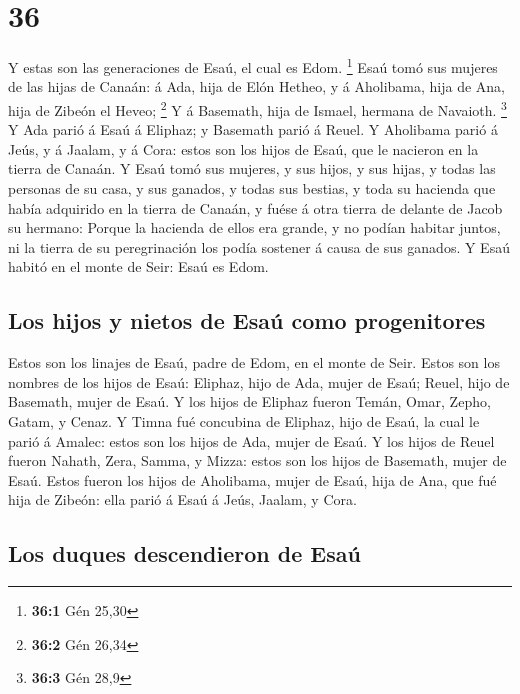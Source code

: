\hypertarget{section-35}{%
\section{36}\label{section-35}}

 Y estas son las generaciones de Esaú, el cual es Edom.
\footnote{\textbf{36:1} Gén 25,30}  Esaú tomó sus mujeres de
las hijas de Canaán: á Ada, hija de Elón Hetheo, y á Aholibama, hija de
Ana, hija de Zibeón el Heveo; \footnote{\textbf{36:2} Gén 26,34}
 Y á Basemath, hija de Ismael, hermana de Navaioth.
\footnote{\textbf{36:3} Gén 28,9}  Y Ada parió á Esaú á
Eliphaz; y Basemath parió á Reuel.  Y Aholibama parió á
Jeús, y á Jaalam, y á Cora: estos son los hijos de Esaú, que le nacieron
en la tierra de Canaán.  Y Esaú tomó sus mujeres, y sus
hijos, y sus hijas, y todas las personas de su casa, y sus ganados, y
todas sus bestias, y toda su hacienda que había adquirido en la tierra
de Canaán, y fuése á otra tierra de delante de Jacob su hermano:
 Porque la hacienda de ellos era grande, y no podían habitar
juntos, ni la tierra de su peregrinación los podía sostener á causa de
sus ganados.  Y Esaú habitó en el monte de Seir: Esaú es
Edom.

\hypertarget{los-hijos-y-nietos-de-esauxfa-como-progenitores}{%
\subsection{Los hijos y nietos de Esaú como
progenitores}\label{los-hijos-y-nietos-de-esauxfa-como-progenitores}}

 Estos son los linajes de Esaú, padre de Edom, en el monte
de Seir.  Estos son los nombres de los hijos de Esaú:
Eliphaz, hijo de Ada, mujer de Esaú; Reuel, hijo de Basemath, mujer de
Esaú.  Y los hijos de Eliphaz fueron Temán, Omar, Zepho,
Gatam, y Cenaz.  Y Timna fué concubina de Eliphaz, hijo de
Esaú, la cual le parió á Amalec: estos son los hijos de Ada, mujer de
Esaú.  Y los hijos de Reuel fueron Nahath, Zera, Samma, y
Mizza: estos son los hijos de Basemath, mujer de Esaú. 
Estos fueron los hijos de Aholibama, mujer de Esaú, hija de Ana, que fué
hija de Zibeón: ella parió á Esaú á Jeús, Jaalam, y Cora.

\hypertarget{los-duques-descendieron-de-esauxfa}{%
\subsection{Los duques descendieron de
Esaú}\label{los-duques-descendieron-de-esauxfa}}

